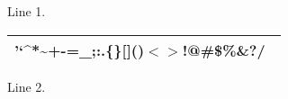 
Line 1.

\begin{center}\begin{tabular}{|l|}
\hline '`\^{}*\~{}+-=\_;:.\{\}[]()$<$$>$!@\#\$\%\&?/\ \\
\hline \end{tabular}\end{center}

Line 2.


